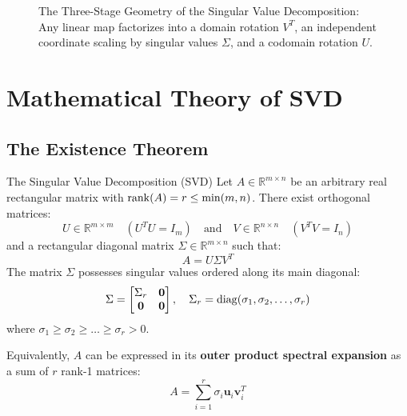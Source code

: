 \begin{figure}[htbp]
\caption{The Three-Stage Geometry of the Singular Value Decomposition: Any linear map factorizes into a domain rotation $V^T$, an independent coordinate scaling by singular values $\Sigma$, and a codomain rotation $U$.}
\label{fig:svd_geometry}
\end{figure}

\section{Mathematical Theory of SVD}

\subsection{The Existence Theorem}

\begin{theorembox}{The Singular Value Decomposition (SVD)}
Let $A \in \mathbb{R}^{m \times n}$ be an arbitrary real rectangular matrix with $\operatorname{rank}(A) = r \le \min(m, n)$. There exist orthogonal matrices:
\begin{equation}
U \in \mathbb{R}^{m \times m} \quad (U^T U = I_m) \quad \text{and} \quad V \in \mathbb{R}^{n \times n} \quad (V^T V = I_n)
\end{equation}
and a rectangular diagonal matrix $\Sigma \in \mathbb{R}^{m \times n}$ such that:
\begin{equation}
A = U \Sigma V^T
\label{eq:full_svd_matrix}
\end{equation}
The matrix $\Sigma$ possesses singular values ordered along its main diagonal:
\begin{equation}
\Sigma = \begin{bmatrix} \Sigma_r & \mathbf{0} \\ \mathbf{0} & \mathbf{0} \end{bmatrix}, \quad \Sigma_r = \operatorname{diag}(\sigma_1, \sigma_2, \dots, \sigma_r)
\end{equation}
where $\sigma_1 \ge \sigma_2 \ge \dots \ge \sigma_r > 0$.

Equivalently, $A$ can be expressed in its \textbf{outer product spectral expansion} as a sum of $r$ rank-1 matrices:
\begin{equation}
A = \sum_{i=1}^r \sigma_i \mathbf{u}_i \mathbf{v}_i^T
\label{eq:svd_outer_product}
\end{equation}
\end{theorembox}

